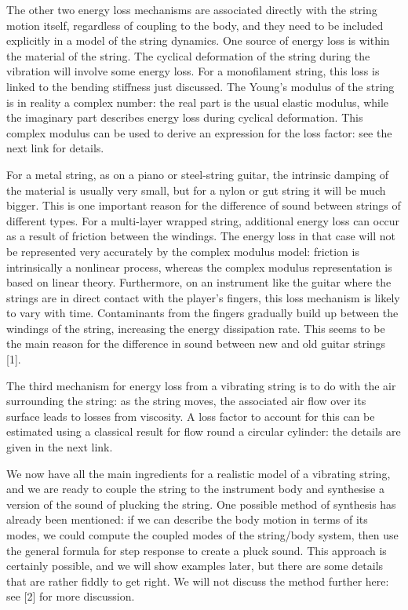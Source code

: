   The other two energy loss mechanisms are associated directly with the string 
  motion itself, regardless of coupling to the body, and they need to be 
  included explicitly in a model of the string dynamics. One source of energy 
  loss is within the material of the string. The cyclical deformation of the 
  string during the vibration will involve some energy loss. For a monofilament 
  string, this loss is linked to the bending stiffness just discussed. The 
  Young's modulus of the string is in reality a complex number: the real part 
  is the usual elastic modulus, while the imaginary part describes energy loss 
  during cyclical deformation. This complex modulus can be used to derive an 
  expression for the loss factor: see the next link for details. 

  For a metal string, as on a piano or steel-string guitar, the intrinsic 
  damping of the material is usually very small, but for a nylon or gut string 
  it will be much bigger. This is one important reason for the difference of 
  sound between strings of different types. For a multi-layer wrapped string, 
  additional energy loss can occur as a result of friction between the 
  windings. The energy loss in that case will not be represented very 
  accurately by the complex modulus model: friction is intrinsically a 
  nonlinear process, whereas the complex modulus representation is based on 
  linear theory. Furthermore, on an instrument like the guitar where the 
  strings are in direct contact with the player's fingers, this loss mechanism 
  is likely to vary with time. Contaminants from the fingers gradually build up 
  between the windings of the string, increasing the energy dissipation rate. 
  This seems to be the main reason for the difference in sound between new and 
  old guitar strings [1]. 

  The third mechanism for energy loss from a vibrating string is to do with the 
  air surrounding the string: as the string moves, the associated air flow over 
  its surface leads to losses from viscosity. A loss factor to account for this 
  can be estimated using a classical result for flow round a circular cylinder: 
  the details are given in the next link. 

  We now have all the main ingredients for a realistic model of a vibrating 
  string, and we are ready to couple the string to the instrument body and 
  synthesise a version of the sound of plucking the string. One possible method 
  of synthesis has already been mentioned: if we can describe the body motion 
  in terms of its modes, we could compute the coupled modes of the string/body 
  system, then use the general formula for step response to create a pluck 
  sound. This approach is certainly possible, and we will show examples later, 
  but there are some details that are rather fiddly to get right. We will not 
  discuss the method further here: see [2] for more discussion. 


